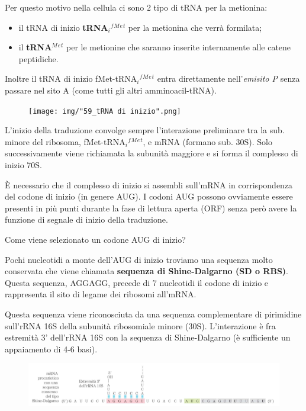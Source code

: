 \documentclass[11pt]{book}
\begin{document}
Per questo motivo nella cellula ci sono 2 tipo di tRNA per la metionina:

\begin{itemize}
\itemsep1pt\parskip0pt
\item
  il tRNA di inizio \textbf{tRNA\(_i\)\(^f\)\(^M\)\(^e\)\(^t\)} per la
  metionina che verrà formilata;
\item
  il \textbf{tRNA\(^M\)\(^e\)\(^t\)} per le metionine che saranno
  inserite internamente alle catene peptidiche.
\end{itemize}

Inoltre il tRNA di inizio fMet-tRNA\(_i\)\(^f\)\(^M\)\(^e\)\(^t\) entra
direttamente nell'\emph{emisito P} senza passare nel sito A (come tutti
gli altri amminoacil-tRNA).

\begin{figure}[htp]
\centering
\texttt{[image: img/"59\_tRNA di inizio".png]}
\caption{}
\label{trna-di-inizio}
\end{figure}

L'inizio della traduzione convolge sempre l'interazione preliminare tra
la sub. minore del ribosoma, fMet-tRNA\(_i\)\(^f\)\(^M\)\(^e\)\(^t\), e
mRNA (formano sub. 30S). Solo successivamente viene richiamata la
subunità maggiore e si forma il complesso di inizio 70S.

È necessario che il complesso di inizio si assembli sull'mRNA in
corrispondenza del codone di inizio (in genere AUG). I codoni AUG
possono ovviamente essere presenti in più punti durante la fase di
lettura aperta (ORF) senza però avere la funzione di segnale di inizio
della traduzione.

Come viene selezionato un codone AUG di inizio?

Pochi nucleotidi a monte dell'AUG di inizio troviamo una sequenza molto
conservata che viene chiamata \textbf{sequenza di Shine-Dalgarno (SD o
RBS)}. Questa sequenza, AGGAGG, precede di 7 nucleotidi il codone di
inizio e rappresenta il sito di legame dei ribosomi all'mRNA.

Questa sequenza viene riconosciuta da una sequenza complementare di
pirimidine sull'rRNA 16S della subunità ribosomiale minore (30S).
L'interazione è fra estremità 3' dell'rRNA 16S con la sequenza di
Shine-Dalgarno (è sufficiente un appaiamento di 4-6 basi).

\begin{figure}[htp]
\centering
\includegraphics[scale=1.00]{img/58_Shine-Dalgarno.png}
\caption{}
\label{shine-dalgarno}
\end{figure}
\end{document}
